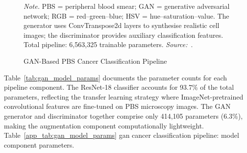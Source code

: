 \begin{figure}[!htbp]
{%
}
\caption{GAN-Based PBS Cancer Classification Pipeline}
\label{app_fig:gan_pipeline}
\vspace{0.5em}\noindent\textit{Note.} PBS = peripheral blood smear; GAN = generative adversarial network; RGB = red--green--blue; HSV = hue--saturation--value. The generator uses ConvTranspose2d layers to synthesise realistic cell images; the discriminator provides auxiliary classification features. Total pipeline: 6,563,325 trainable parameters. \textit{Source:}~\cite{asthana2025cancer}.
\end{figure}

Table~\ref{tab:gan_model_params} documents the parameter counts for each pipeline component. The ResNet-18 classifier accounts for 93.7\% of the total parameters, reflecting the transfer learning strategy where ImageNet-pretrained convolutional features are fine-tuned on PBS microscopy images. The GAN generator and discriminator together comprise only 414,105 parameters (6.3\%), making the augmentation component computationally lightweight.
\noindent Table~\ref{app_tab:gan_model_params} gan cancer classification pipeline: model component parameters.

